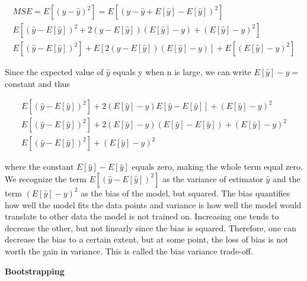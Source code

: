 \documentclass[12pt,a4paper]{article}
\begin{document}
\begin{equation}\label{eq:mseDerive}
\begin{aligned}
MSE = E[(y-\hat{y})^2] = E[(y-\hat{y} + E[\hat{y}] - E[\hat{y}])^2]
\\
E[(\hat{y} - E[\hat{y}])^2 + 2(\hat{y} - E[\hat{y}])(E[\hat{y}]-y) + (E[\hat{y}]-y)^2]
\\
E[(\hat{y} - E[\hat{y}])^2] + E[2(\hat{y} - E[\hat{y}])(E[\hat{y}]-y)] + E[(E[\hat{y}]-y)^2]
\end{aligned}
\end{equation}

\noindent Since the expected value of $\hat{y}$ equals y when n is large, we can write $E[\hat{y}] - y =$ constant and thus

\begin{equation}\label{eq:mseDerive2}
\begin{aligned}
E[(\hat{y} - E[\hat{y}])^2] + 2(E[\hat{y}]-y)E[\hat{y}-E[\hat{y}]] + (E[\hat{y}]-y)^2
\\
E[(\hat{y} - E[\hat{y}])^2] + 2(E[\hat{y}]-y)(E[\hat{y}] - E[\hat{y}])+ (E[\hat{y}]-y)^2
\\
E[(\hat{y} - E[\hat{y}])^2] + (E[\hat{y}]-y)^2
\end{aligned}
\end{equation}

\noindent where the constant $E[\hat{y}] - E[\hat{y}]$ equals zero, making the whole term equal zero. 
\\
We recognize the term $E[(\hat{y} - E[\hat{y}])^2]$ as the variance of estimator $\hat{y}$ and the term $(E[\hat{y}]-y)^2$ as the bias of the model, but squared. The bias quantifies how well the model fits the data points and variance is how well the model would translate to other data the model is not trained on. Increasing one tends to decrease the other, but not linearly since the bias is squared. Therefore, one can decrease the bias to a certain extent, but at some point, the loss of bias is not worth the gain in variance. This is called the bias variance trade-off. 

\begin{center}
\large{\textbf{Bootstrapping}}
\end{center}
\end{document}
